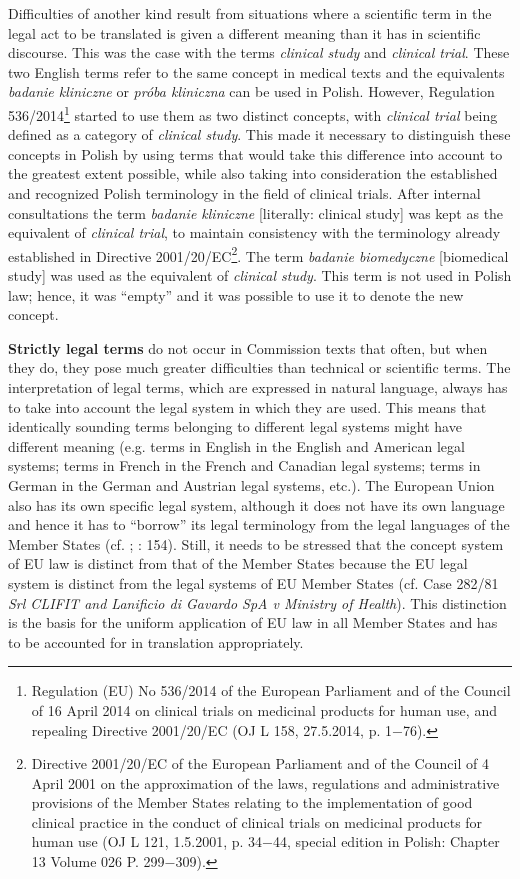 \documentclass[output=paper]{langsci/langscibook}
\begin{document}
Difficulties of another kind result from situations where a scientific term in the legal act to be translated is given a different meaning than it has in scientific discourse. This was the case with the terms \textit{clinical study} and \textit{clinical trial}. These two English terms refer to the same concept in medical texts and the equivalents \textit{badanie kliniczne} or \textit{próba kliniczna} can be used in Polish. However, Regulation 536/2014\footnote{Regulation (EU) No 536/2014 of the European Parliament and of the Council of 16 April 2014 on clinical trials on medicinal products for human use, and repealing Directive 2001/20/EC (OJ L 158, 27.5.2014, p. 1$-$76).} started to use them as two distinct concepts, with \textit{clinical trial} being defined as a category of \textit{clinical study}. This made it necessary to distinguish these concepts in Polish by using terms that would take this difference into account to the greatest extent possible, while also taking into consideration the established and recognized Polish terminology in the field of clinical trials. After internal consultations the term \textit{badanie kliniczne} [literally: clinical study] was kept as the equivalent of \textit{clinical trial}, to maintain consistency with the terminology already established in Directive 2001/20/EC\footnote{Directive 2001/20/EC of the European Parliament and of the Council of 4 April 2001 on the approximation of the laws, regulations and administrative provisions of the Member States relating to the implementation of good clinical practice in the conduct of clinical trials on medicinal products for human use (OJ L 121, 1.5.2001, p. 34$-$44, special edition in Polish: Chapter 13 Volume 026 P. 299$-$309).}. The term \textit{badanie biomedyczne} [biomedical study] was used as the equivalent of \textit{clinical study}. This term is not used in Polish law; hence, it was “empty” and it was possible to use it to denote the new concept.

\textbf{Strictly legal terms} do not occur in Commission texts that often, but when they do, they pose much greater difficulties than technical or scientific terms. The interpretation of legal terms, which are expressed in natural language, always has to take into account the legal system in which they are used. This means that identically sounding terms belonging to different legal systems might have different meaning (e.g. terms in English in the English and American legal systems; terms in French in the French and Canadian legal systems; terms in German in the German and Austrian legal systems, etc.). The European Union also has its own specific legal system, although it does not have its own language and hence it has to “borrow” its legal terminology from the legal languages of the Member States (cf. \citealt[79, 80]{Kjær2007}; \citealt{Robertson2010}: 154). Still, it needs to be stressed that the concept system of EU law is distinct from that of the Member States because the EU legal system is distinct from the legal systems of EU Member States (cf. Case 282/81 \textit{Srl CLIFIT and Lanificio di Gavardo SpA v Ministry of Health}). This distinction is the basis for the uniform application of EU law in all Member States and has to be accounted for in translation appropriately. 
\end{document}

